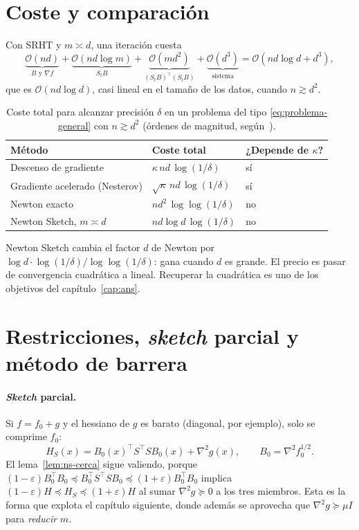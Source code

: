 \documentclass[11pt,a4paper,oneside]{book}
\theoremstyle{definition}
\theoremstyle{remark}
\newcommand{\cO}{\mathcal{O}}
\newcommand{\T}{^{\top}}
\newcommand{\eps}{\varepsilon}
\begin{document}
\section{Coste y comparación}

Con SRHT y $m\asymp d$, una iteración cuesta
\[ \underbrace{\cO(nd)}_{B\text{ y }\nabla f}+\underbrace{\cO(nd\log m)}_{S_tB}+\underbrace{\cO(md^2)}_{(S_tB)\T(S_tB)}+\underbrace{\cO(d^3)}_{\text{sistema}}=\cO(nd\log d+d^3), \]
que es $\cO(nd\log d)$, casi lineal en el tamaño de los datos, cuando $n\gtrsim d^2$.

\begin{table}[ht]
\centering\small
\caption{Coste total para alcanzar precisión $\delta$ en un problema del tipo \eqref{eq:problema-general} con
$n\gtrsim d^2$ (órdenes de magnitud, según~\cite{PW17,LWP21}).}
\label{tab:complejidad-ns}
\begin{tabular}{@{}lll@{}}
\toprule
Método & Coste total & ¿Depende de $\kappa$? \\
\midrule
Descenso de gradiente & $\kappa\,nd\,\log(1/\delta)$ & sí \\
Gradiente acelerado (Nesterov) & $\sqrt\kappa\,nd\,\log(1/\delta)$ & sí \\
Newton exacto & $nd^2\,\log\log(1/\delta)$ & no \\
Newton Sketch, $m\asymp d$ & $nd\log d\,\log(1/\delta)$ & no \\
\bottomrule
\end{tabular}
\end{table}

Newton Sketch cambia el factor $d$ de Newton por $\log d\cdot\log(1/\delta)/\log\log(1/\delta)$: gana cuando $d$ es grande. El
precio es pasar de convergencia cuadrática a lineal. Recuperar la cuadrática es uno de los objetivos del
capítulo~\ref{cap:ans}.

\section{Restricciones, \emph{sketch} parcial y método de barrera}

\paragraph{\emph{Sketch} parcial.} Si $f=f_0+g$ y el hessiano de $g$ es barato (diagonal, por ejemplo), solo se
comprime $f_0$:
\begin{equation}\label{eq:ns-parcial}
  H_S(x)=B_0(x)\T S\T SB_0(x)+\nabla^2g(x),\qquad B_0=\nabla^2f_0^{1/2}.
\end{equation}
El lema~\ref{lem:ns-cerca} sigue valiendo, porque $(1-\eps)B_0\T B_0\preceq B_0\T S\T SB_0\preceq(1+\eps)B_0\T B_0$ implica
$(1-\eps)H\preceq H_S\preceq(1+\eps)H$ al sumar $\nabla^2g\succeq0$ a los tres miembros. Esta es la forma que explota
el capítulo siguiente, donde además se aprovecha que $\nabla^2 g\succeq\mu I$ para \emph{reducir} $m$.
\end{document}
